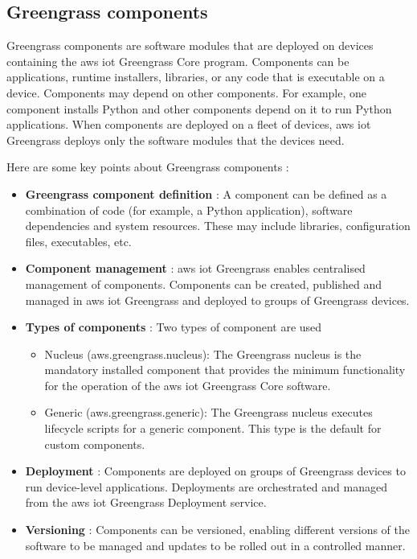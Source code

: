 \subsection{Greengrass components}
Greengrass components are software modules that are deployed on devices containing the \gls{aws} \acrshort{iot} Greengrass Core program. Components can be applications, runtime installers, libraries, or any code that is executable on a device. Components may depend on other components. For example, one component installs Python and other components depend on it to run Python applications. When components are deployed on a fleet of devices, \gls{aws} \acrshort{iot} Greengrass deploys only the software modules that the devices need. \cite{aws_iot_greengrass_components}

Here are some key points about Greengrass components :
\begin{itemize}
    \item \textbf{Greengrass component definition} : A component can be defined as a combination of code (for example, a Python application), software dependencies and system resources. These may include libraries, configuration files, executables, etc.
    \item \textbf{Component management} : \gls{aws} \acrshort{iot} Greengrass enables centralised management of components. Components can be created, published and managed in \gls{aws} \acrshort{iot} Greengrass and deployed to groups of Greengrass devices.
    \item \textbf{Types of components} : Two types of component are used
    \begin{itemize}
        \item Nucleus (aws.greengrass.nucleus): The Greengrass nucleus is the mandatory installed component that provides the minimum functionality for the operation of the \gls{aws} \acrshort{iot} Greengrass Core software.
        \item Generic (aws.greengrass.generic): The Greengrass nucleus executes lifecycle scripts for a generic component. This type is the default for custom components.
    \end{itemize}
    \item \textbf{Deployment} : Components are deployed on groups of Greengrass devices to run device-level applications. Deployments are orchestrated and managed from the \gls{aws} \acrshort{iot} Greengrass Deployment service.
    \item \textbf{Versioning} : Components can be versioned, enabling different versions of the software to be managed and updates to be rolled out in a controlled manner.
\end{itemize}

